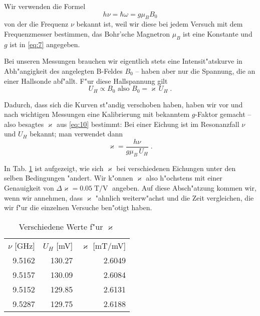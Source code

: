 \documentclass[a4paper,12pt]{article}
\begin{document}
Wir verwenden die Formel
\begin{equation}
  \label{eq:9}
  h \nu = \hbar \omega = g \mu_B B_0
\end{equation}
von der die Frequenz $\nu$ bekannt ist, weil wir diese bei jedem
Versuch mit dem Frequenzmesser bestimmen, das Bohr'sche Magnetron
$\mu_B$ ist eine Konstante und $g$ ist in \eqref{eq:7} angegeben.

Bei unseren Messungen brauchen wir eigentlich stets eine
Intensit"atskurve in Abh"angigkeit des angelegten B-Feldes $B_0$ --
haben aber nur die Spannung, die an einer Hallsonde abf"allt. 
F"ur diese Hallspannung gilt
\begin{equation}
  \label{eq:10}
  U_H \propto B_0 \text{ also } B_0 = \varkappa \, U_H \;.
\end{equation}

Dadurch, dass sich die Kurven st"andig verschoben haben, haben wir vor
und nach wichtigen Messungen eine Kalibrierung mit bekanntem
$g$-Faktor gemacht -- also besagtes $\varkappa$ aus \eqref{eq:10}
bestimmt:
Bei einer Eichung ist im Resonanzfall $\nu$ und $U_H$ bekannt; man
verwendet dann
\begin{equation}
  \label{eq:11}
  \varkappa = \frac{ h \nu } {g \mu_B \, U_H }  \;.
\end{equation}

In Tab. \ref{tab:varkappa_verduennung} ist aufgezeigt, wie sich
$\varkappa$ bei verschiedenen Eichungen unter den selben Bedingungen
"andert. Wir k"onnen $\varkappa$ also h"ochstens mit einer Genauigkeit
von $\Delta \varkappa = 0.05 \operatorname{T/V}$ angeben. Auf diese
Absch"atzung kommen wir, wenn wir annehmen, dass $\varkappa$ "ahnlich
weiterw"achst und die Zeit vergleichen, die wir f"ur die einzelnen
Versuche ben"otigt haben.

\begin{table}[!h]
  \centering
  \begin{tabular}{r r r}
    $\nu$ [GHz] & $U_H$ [mV] & $\varkappa$ [mT/mV] \\
9.5162  &  130.27  &  2.6049 \\
9.5157  &  130.09  &  2.6084 \\
9.5152  &  129.85  &  2.6131 \\
9.5287  &  129.75  &  2.6188
  \end{tabular}
  \caption{Verschiedene Werte f"ur $\varkappa$}
  \label{tab:varkappa_verduennung}
\end{table}
\end{document}
